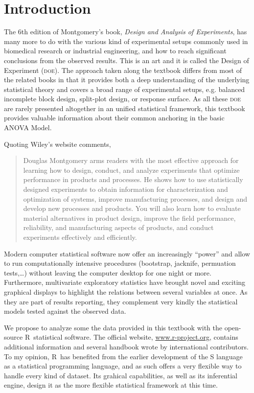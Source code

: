 \documentclass[11pt,a4paper]{memoir}\usepackage[]{graphicx}\usepackage[]{color}
\newcommand{\R}{\textsf{R}}
\begin{document}
\chapter{Introduction}
\label{cha:introduction}
\setcounter{page}{1} 
The 6th edition of Montgomery's book, \emph{Design and Analysis of
Experiments}, has many more to do with the various kind of experimental
setups commonly used in biomedical research or industrial
engineering, and how to reach significant conclusions from the
observed results. This is an art and it is called the Design of
Experiment (\textsc{doe}). The approach taken along the textbook
differs from most of the related books in that it provides both a deep
understanding of the underlying statistical theory and covers a broad
range of experimental setups, e.g. balanced incomplete block design,
split-plot design, or response surface. As all these \textsc{doe} are
rarely presented altogether in an unified statistical framework, this
textbook provides valuable information about their common anchoring in
the basic ANOVA Model.

Quoting Wiley's website comments, 
\begin{quote}
  Douglas Montgomery arms readers with the most effective approach for
  learning how to design, conduct, and analyze experiments that
  optimize performance in products and processes. He shows how to use
  statistically designed experiments to obtain information for
  characterization and optimization of systems, improve manufacturing
  processes, and design and develop new processes and products. You
  will also learn how to evaluate material alternatives in product
  design, improve the field performance, reliability, and
  manufacturing aspects of products, and conduct experiments
  effectively and efficiently.
\end{quote}

Modern computer statistical software now offer an increasingly ``power''
and allow to run computationally intensive procedures (bootstrap,
jacknife, permuation tests,\ldots) without leaving the computer
desktop for one night or more. Furthermore, multivariate exploratory
statistics have brought novel and exciting graphical displays to
highlight the relations between several variables at once. As they are
part of results reporting, they complement very kindly the statistical
models tested against the observed data.

We propose to analyze some the data provided in this textbook with the
open-source \R\ statistical software. The official website,
\url{www.r-project.org}, contains additional information and several
handbook wrote by international contributors. To my opinion, \R\ has
benefited from the earlier development of the \textsf{S} language as a
statistical programming language, and as such offers a very flexible
way to handle every kind of dataset. Its grahical capabilities, as
well as its inferential engine, design it as the more flexible
statistical framework at this time.
\end{document}
